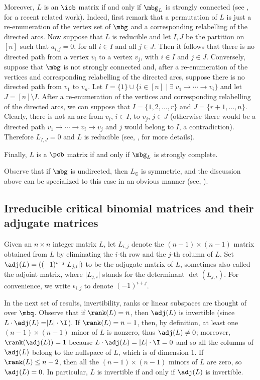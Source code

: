 Moreover, $L$ is an $\icb$ matrix if and only if $\mbg_L$ is strongly
connected (see \cite{cv}, for a recent related work). Indeed, first
remark that a permutation of $L$ is just a re-enumeration of the
vertex set of $\mbg$ and a corresponding relabelling of the directed
arcs. Now suppose that $L$ is reducible and let $I,J$ be the partition
on $[n]$ such that $a_{i,j}=0$, for all $i\in I$ and all $j\in
J$. Then it follows that there is no directed path from a vertex $v_i$
to a vertex $v_j$, with $i\in I$ and $j\in J$. Conversely, suppose
that $\mbg$ is not strongly connected and, after a re-enumeration of
the vertices and corresponding relabelling of the directed arcs,
suppose there is no directed path from $v_1$ to $v_n$. Let
$I=\{1\}\cup\{i\in [n]\mid \exists \; v_1\to\cdots\to v_i\}$ and let
$J=[n]\setminus I$. After a re-enumeration of the vertices and
corresponding relabelling of the directed arcs, we can suppose that
$I=\{1,2,\ldots ,r\}$ and $J=\{r+1,\ldots ,n\}$. Clearly, there is not
an arc from $v_i$, $i\in I$, to $v_j$, $j\in J$ (otherwise there would
be a directed path $v_1\to\cdots\to v_i\to v_j$ and $j$ would belong
to $I$, a contradiction). Therefore $L_{I,J}=0$ and $L$ is reducible
(see, \eg \cite[Theorem~3.2.1]{br}, for more details).

Finally, $L$ is a $\pcb$ matrix if and only if $\mbg_L$ is strongly
complete.

Observe that if $\mbg$ is undirected, then $L_{\mathbb{G}}$ is
symmetric, and the discussion above can be specialized to this case in
an obvious manner (see, \eg \cite{ms}).

\vspace{-.25em}

\subsection{Irreducible critical binomial matrices and their adjugate 
matrices}\label{ibm-adj} %

 Given an $n\times n$ integer matrix $L$, let $L_{i,j}$
denote the $(n-1)\times (n-1)$ matrix obtained from $L$ by eliminating
the $i$-th row and the $j$-th column of $L$. Set $\adj(L)=
((-1)^{i+j}\lvert L_{j,i}\rvert)$ to be the adjugate matrix of $L$,
sometimes also called the adjoint matrix, where $\lvert L_{j,i}\rvert$
stands for the determinant $\det(L_{j,i})$. For convenience, we write
$\epsilon_{i,j}$ to denote $(-1)^{i+j}$.

In the next set of results, invertibility, ranks or linear subspaces
are thought of over $\mbq$. Observe that if $\rank(L)=n$, then
$\adj(L)$ is invertible (since $L\cdot \adj(L)=\rvert
L\rvert\cdot\I$). If $\rank(L)=n-1$, then, by definition, at least
one $(n-1)\times (n-1)$ minor of $L$ is nonzero, thus $\adj(L)\neq 0$;
moreover, $\rank(\adj(L))=1$ because $L\cdot \adj(L)=\lvert
L\rvert\cdot \I=0$ and so all the columns of $\adj(L)$ belong to the
nullspace of $L$, which is of dimension $1$. If $\rank(L)\leq n-2$,
then all the $(n-1)\times (n-1)$ minors of $L$ are zero, so
$\adj(L)=0$. In particular, $L$ is invertible if and only if $\adj(L)$
is invertible.

